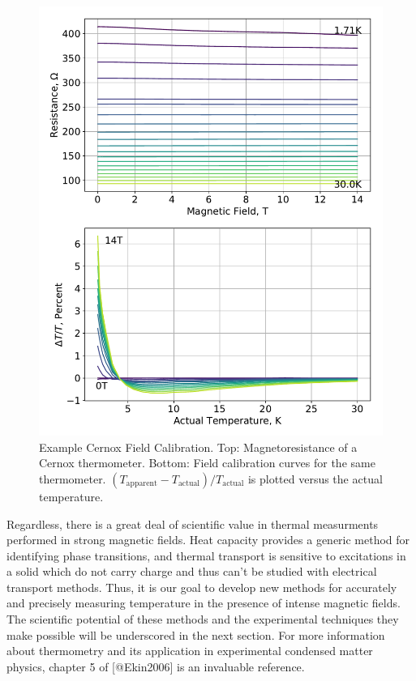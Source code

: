 \begin{figure}
\centering
\includegraphics{figures/cal_cernox_1.pdf}
\caption{Example Cernox Field Calibration. Top: Magnetoresistance of a
Cernox thermometer. Bottom: Field calibration curves for the same
thermometer.
\((T_{\mathrm{apparent}} - T_{\mathrm{actual}})/T_{\mathrm{actual}}\) is
plotted versus the actual temperature. \label{cernox_fieldcal}}
\end{figure}

Regardless, there is a great deal of scientific value in thermal
measurments performed in strong magnetic fields. Heat capacity provides
a generic method for identifying phase transitions, and thermal
transport is sensitive to excitations in a solid which do not carry
charge and thus can't be studied with electrical transport methods.
Thus, it is our goal to develop new methods for accurately and precisely
measuring temperature in the presence of intense magnetic fields. The
scientific potential of these methods and the experimental techniques
they make possible will be underscored in the next section. For more
information about thermometry and its application in experimental
condensed matter physics, chapter 5 of {[}@Ekin2006{]} is an invaluable
reference.

